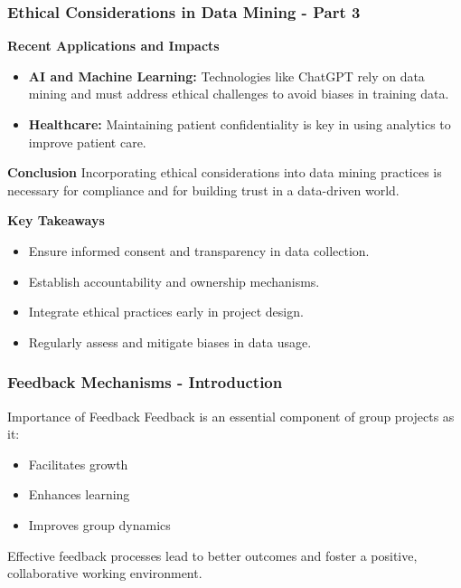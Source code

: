 \documentclass[aspectratio=169]{beamer}
\begin{document}
\begin{frame}[fragile]
    \frametitle{Ethical Considerations in Data Mining - Part 3}
    \textbf{Recent Applications and Impacts}
    \begin{itemize}
        \item \textbf{AI and Machine Learning:} Technologies like ChatGPT rely on data mining and must address ethical challenges to avoid biases in training data.
        \item \textbf{Healthcare:} Maintaining patient confidentiality is key in using analytics to improve patient care.
    \end{itemize}

    \textbf{Conclusion}
    Incorporating ethical considerations into data mining practices is necessary for compliance and for building trust in a data-driven world.

    \textbf{Key Takeaways}
    \begin{itemize}
        \item Ensure informed consent and transparency in data collection.
        \item Establish accountability and ownership mechanisms.
        \item Integrate ethical practices early in project design.
        \item Regularly assess and mitigate biases in data usage.
    \end{itemize}
\end{frame}

\begin{frame}[fragile]
    \frametitle{Feedback Mechanisms - Introduction}
    \begin{block}{Importance of Feedback}
        Feedback is an essential component of group projects as it:
        \begin{itemize}
            \item Facilitates growth
            \item Enhances learning
            \item Improves group dynamics
        \end{itemize}
        Effective feedback processes lead to better outcomes and foster a positive, collaborative working environment.
    \end{block}
\end{frame}
\end{document}
